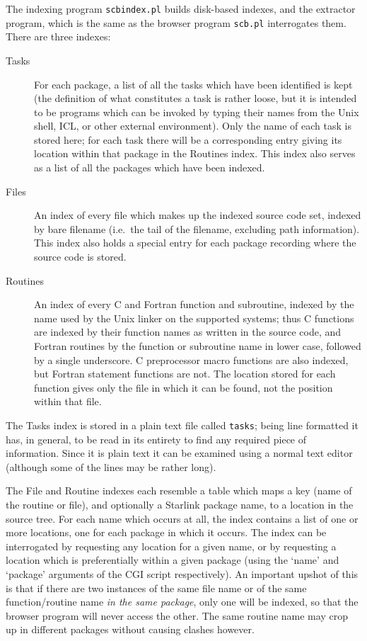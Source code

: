 \documentclass[twoside,11pt]{article}
\renewcommand{\_}{\texttt{\symbol{95}}}
\begin{document}
The indexing program {\tt scbindex.pl} builds disk-based indexes, and the 
extractor program, which is the same as the browser program  {\tt scb.pl}
interrogates them.  There are three indexes:
\begin{description}
\item[Tasks]
For each package, a list of all the tasks which have been identified
is kept (the definition of what constitutes a task is rather 
loose, but it is intended to be programs which can be invoked by
typing their names from the Unix shell, ICL, or other external
environment).
Only the name of each task is stored here; 
for each task there will be a corresponding entry giving its location within
that package in the Routines index.
This index also serves as a list of all the
packages which have been indexed.
%
\item[Files]
An index of every file which makes up the indexed source code set,
indexed by bare filename (i.e.\ the tail of the filename, excluding
path information). 
This index also holds a special entry for each package 
recording where the source code is stored.
%
\item[Routines]
An index of every C and Fortran function and subroutine, 
indexed by the name used by the Unix linker on the supported systems;
thus C functions are indexed by their function names 
as written in the source code, and Fortran routines by the function 
or subroutine name in lower case, followed by a single underscore.
C preprocessor macro functions are also indexed,
but Fortran statement functions are not.
The location stored for each function gives only the file in
which it can be found, not the position within that file.
\end{description}

The Tasks index is stored in a plain text file called {\tt tasks};
being line formatted it has, in general, 
to be read in its entirety to find any
required piece of information.
Since it is plain text 
it can be examined using a normal text editor 
(although some of the lines may be rather long).

The File and Routine indexes
each resemble a table which
maps a key (name of the routine or file), and optionally a 
Starlink package name, to a location in the source tree. 
For each name which occurs at all,
the index contains a list of one or more locations, 
one for each package in which it occurs.
The index can be interrogated by requesting any location for a given name,
or by requesting a location which is preferentially within a given package
(using the `name' and `package' arguments of the CGI script respectively).
An important upshot of this is that if there are two instances of
the same file name or of the same function/routine name 
{\em in the same package\/}, only one will be indexed, so that the
browser program will never access the other.
The same routine name may crop up in different packages without causing
clashes however.
\end{document}

